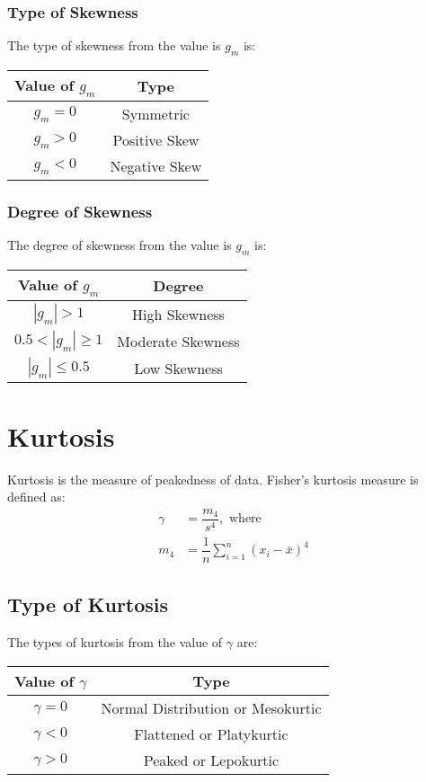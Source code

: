 \subsubsection{Type of Skewness}
The type of skewness from the value is $g_m$ is:
\begin{table}[htbp]
	\centering
	\begin{tabular}{c c}
		\toprule
		Value of $g_m$ & Type\\
		\midrule
		$g_m = 0$ & Symmetric\\
		$g_m > 0$ & Positive Skew\\
		$g_m < 0$ & Negative Skew\\
		\bottomrule
	\end{tabular}
\end{table}

\subsubsection{Degree of Skewness}
The degree of skewness from the value is $g_m$ is:
\begin{table}[htbp]
	\centering
	\begin{tabular}{c c}
		\toprule
		Value of $g_m$ & Degree\\
		\midrule
		$|g_m| > 1$ & High Skewness\\
		$0.5 <|g_m| \geq 1$ & Moderate Skewness\\
		$|g_m| \leq 0.5$ & Low Skewness\\
		\bottomrule
	\end{tabular}
\end{table}


\section{Kurtosis}
Kurtosis is the measure of peakedness of data. Fisher's kurtosis measure is defined as:
\begin{align}
	\gamma &= \dfrac{m_4}{s^4}, \text{ where}\\
	m_4 &= \dfrac{1}{n}\sum_{i=1}^{n} \left( x_i - \bar{x} \right)^4
\end{align}

\subsection{Type of Kurtosis}
The types of kurtosis from the value of $\gamma$ are:
\begin{table}[htbp]
	\centering
	\begin{tabular}{c c}
		\toprule
		Value of $\gamma$ & Type\\
		\midrule
		$\gamma = 0$ & Normal Distribution or Mesokurtic\\
		$\gamma < 0$ & Flattened or Platykurtic\\
		$\gamma > 0$ & Peaked or Lepokurtic\\
		\bottomrule
	\end{tabular}
\end{table}
